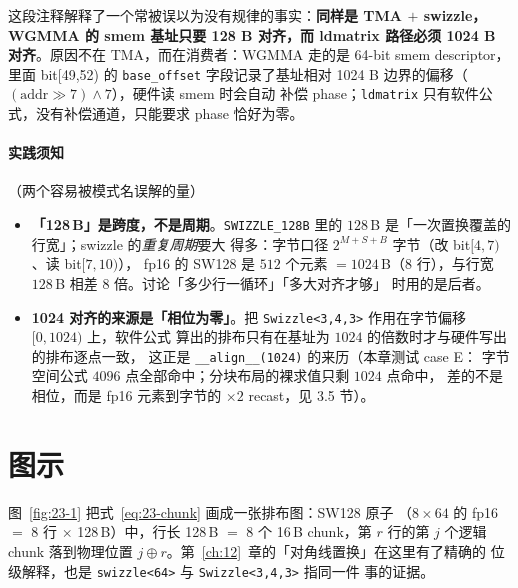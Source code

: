这段注释解释了一个常被误以为没有规律的事实：\textbf{同样是 TMA
$+$ swizzle，WGMMA 的 smem 基址只要 128 B 对齐，而 ldmatrix 路径必须
1024 B 对齐}。原因不在 TMA，而在消费者：WGMMA 走的是 64-bit smem
descriptor，里面 bit[49,52) 的 \texttt{base\_offset} 字段记录了基址相对
1024 B 边界的偏移（$(\text{addr}\gg7)\wedge7$），硬件读 smem 时会自动
补偿 phase；\texttt{ldmatrix} 只有软件公式，没有补偿通道，只能要求
phase 恰好为零。

\paragraph{实践须知}（两个容易被模式名误解的量）
\begin{itemize}
  \item \textbf{「128\,B」是跨度，不是周期}。\texttt{SWIZZLE\_\allowbreak{}128\allowbreak{}B} 里的
        $128$\,B 是「一次置换覆盖的行宽」；swizzle 的\emph{重复周期}要大
        得多：字节口径 $2^{M+S+B}$ 字节（改 bit$[4,7)$、读 bit$[7,10)$），
        fp16 的 SW128 是 $512$ 个元素 $=1024$\,B（$8$ 行），与行宽
        $128$\,B 相差 $8$ 倍。讨论「多少行一循环」「多大对齐才够」
        时用的是后者。
  \item \textbf{1024 对齐的来源是「相位为零」}。把
        \texttt{Swizzle\allowbreak{}<3,\allowbreak{}4,\allowbreak{}3>} 作用在字节偏移 $[0,1024)$ 上，软件公式
        算出的排布只有在基址为 $1024$ 的倍数时才与硬件写出的排布逐点一致，
        这正是 \texttt{\_\allowbreak{}\_\allowbreak{}align\_\allowbreak{}\_\allowbreak{}(1024)} 的来历（本章测试 case E：
        字节空间公式 $4096$ 点全部命中；分块布局的裸求值只剩 $1024$ 点命中，
        差的不是相位，而是 fp16 元素到字节的 $\times2$ recast，见
        3.5 节）。
\end{itemize}

\needspace{96mm}

\section{图示}

图~\ref{fig:23-1} 把式~\eqref{eq:23-chunk} 画成一张排布图：SW128 原子
（$8\times64$ 的 fp16 $=$ 8 行 $\times$ 128\,B）中，行长 128\,B $=$
8 个 16\,B chunk，第 $r$ 行的第 $j$ 个逻辑 chunk 落到物理位置
$j\oplus r$。第~\ref{ch:12}~章的「对角线置换」在这里有了精确的
位级解释，也是 \texttt{swizzle<64>} 与 \texttt{Swizzle\allowbreak{}<3,\allowbreak{}4,\allowbreak{}3>} 指同一件
事的证据。

